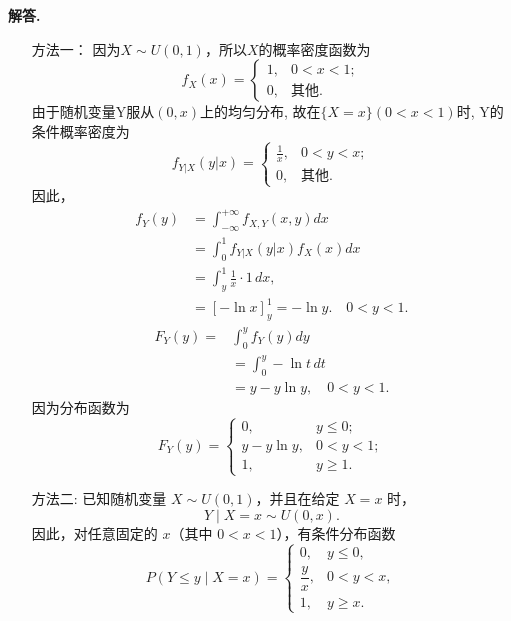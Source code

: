 \documentclass[12pt, a4paper, oneside]{ctexart}
\newenvironment{solution}{\par\noindent\textbf{解答. }}{\par}
\begin{document}
\begin{solution}
\begin{itemize}
    \item[方法一：]因为$X\sim U(0,1)$，所以$X$的概率密度函数为
\begin{equation}
    f_X(x)=\begin{cases}
    1, &0<x<1;\\
    0, &\text{其他}.
    \end{cases}
    \nonumber
\end{equation}
由于随机变量Y服从$(0,x)$上的均匀分布, 故在$\{X=x\}(0<x<1)$时, Y的条件概率密度为
\begin{equation}
    f_{Y|X}(y|x)=\begin{cases}
    \frac1x,&0<y<x;\\
    0,&\text{其他}.
    \end{cases}
    \nonumber
\end{equation}
因此，
\begin{equation}
    \begin{aligned}
        f_Y(y) &= \int_{-\infty}^{+\infty} f_{X,Y}(x,y) dx\\
        &= \int_{0}^{1} f_{Y|X}(y|x) f_X(x) dx\\
        &= \int_y^1 \frac{1}{x} \cdot 1 \, dx,\\
        &= [-\ln x]_y^1 = -\ln y.\quad 0<y<1. 
    \end{aligned}
    \nonumber
\end{equation}
\begin{equation}
    \begin{aligned}
    F_Y(y)=&\int_0^y f_Y(y)dy\\
    &= \int_0^y -\ln t \, dt\\
    &= y - y \ln y, \quad 0<y<1.
    \end{aligned}
    \nonumber
\end{equation}
因为分布函数为
\begin{equation}
    F_Y(y)=\begin{cases}
    0, & y\leqslant 0;\\
    y - y \ln y, & 0<y<1;\\
    1, & y\geqslant 1.
    \end{cases}
    \nonumber
\end{equation}
\item[方法二:]已知随机变量 $X\sim U(0,1)$，并且在给定 $X=x$ 时，
\[
Y \mid X=x \sim U(0,x).
\]
因此，对任意固定的 $x$（其中 $0<x<1$），有条件分布函数
\[
P(Y \le y \mid X=x) =
\begin{cases}
0, & y \le 0,\\[6pt]
\dfrac{y}{x}, & 0<y<x,\\[6pt]
1, & y \ge x.
\end{cases}
\]


\end{itemize}
\end{solution}
\end{document}
